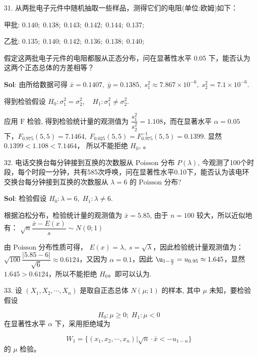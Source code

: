 

31. 从两批电子元件中随机抽取一些样品，测得它们的电阻(单位:欧姆)如下： \par 
甲批: $0.140;\;0.138;\;0.143;\;0.142;\;0.144;\;0.137;\;$  \par
乙批: $0.135;\;0.140;\;0.142;\;0.136;\;0.138;\;0.140;\;$

假定这两批电子元件的电阻都服从正态分布，问在显著性水平 0.05 下，能否认为这两个正态总体的方差相等？

\textbf{Sol}: 由所给数据可得 $\bar{x}=0.1407,\;\bar{y}=0.1385,\;s_1^2\approx7.867\times 10^{-6},\;s_2^2=7.1\times10^{-6}$.

得到检验假设 $H_0:\sigma_1^2=\sigma_2^2,\quad H_1:\sigma_1^2\not=\sigma_2^2$.

应用 $\text{F}$ 检验, 得到检验统计量的观测值为 $\dfrac{s_1^2}{s_2^2}=1.108$，而在显著水平 $\alpha=0.05$ 下，$F_{0.975}(5,5)=7.1464,\;F_{0.025}(5,5)=F^{-1}_{0.975}(5,5)=0.1399$. 显然 $0.1399<1.108<7.1464$，
所以不能拒绝 $H_0$, 
。


\vspace{12pt}

32. 电话交换台每分钟接到互换的次数服从 $\text{Poisson}$ 分布 $P(\lambda)$, 今观测了100个时段，每个时段一分钟，共有585次呼唤，问在显著性水平0.10下，能否认为该电环交换台每分钟接到互换的次数服从 $\lambda=6$ 的 $\text{Poisson}$ 分布?

\textbf{Sol}: 检验假设 $H_0:\lambda=6,\;H_1:\lambda\not=6$.

根据泊松分布，检验统计量的观测值为 $\bar{x}=5.85$, 
由于 $n=100$ 较大，所以近似地有： $\sqrt{n}\dfrac{\bar{x}-E(x)}{s}\sim N(0;1)$

由 $\text{Poisson}$ 分布性质可得， $E(x)=\lambda,\;s=\sqrt{\lambda}$，因此检验统计量观测值为：$\sqrt{100}\dfrac{|5.85-6|}{\sqrt{6}}\approx0.6124$，又因为 $\alpha=0.1$，因此 $\u_{1-\frac{\alpha}{2}}=u_{0.95}\approx1.645$，显然 $1.645>0.6124$，所以不能拒绝 $H_0$。即可以认为.




\vspace{12pt}

33. 设 $(X_1,X_2,\cdots,X_n)$ 是取自正态总体 $N(\mu;1)$ 的样本, 其中 $\mu$ 未知，要检验假设

$$
H_0:\mu\geqslant0;\;H_1:\mu<0
$$
在显著性水平 $\alpha$ 下，采用拒绝域为

$$
W_1=\big\{(x_1,x_2,\cdots,x_n)\big|\sqrt{n}\cdot\bar{x}<-u_{1-\alpha}\big\}
$$
的 $\mu$ 检验。

